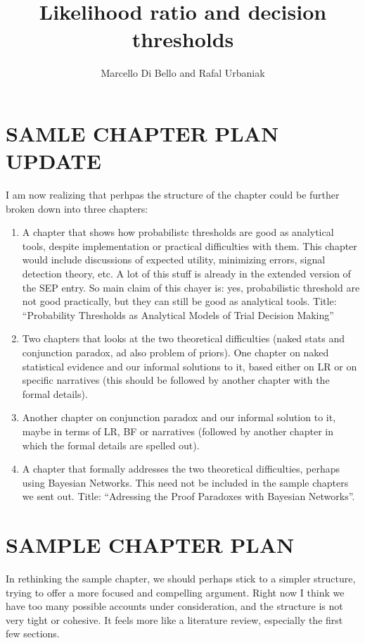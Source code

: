 \documentclass[10pt,dvipsnames,enabledeprecatedfontcommands]{scrartcl}
\title{Likelihood ratio and decision thresholds}
\author{Marcello Di Bello and Rafal Urbaniak}
\date{}
\begin{document}
\maketitle

\section*{SAMLE CHAPTER PLAN UPDATE}

I am now realizing that perhpas the structure of the chapter could be
further broken down into three chapters:

\begin{enumerate}
\def\labelenumi{\arabic{enumi}.}
\item
  A chapter that shows how probabilistc thresholds are good as
  analytical tools, despite implementation or practical difficulties
  with them. This chapter would include discussions of expected utility,
  minimizing errors, signal detection theory, etc. A lot of this stuff
  is already in the extended version of the SEP entry. So main claim of
  this chayer is: yes, probabilistic threshold are not good practically,
  but they can still be good as analytical tools. Title: ``Probability
  Thresholds as Analytical Models of Trial Decision Making''
\item
  Two chapters that looks at the two theoretical difficulties (naked
  stats and conjunction paradox, ad also problem of priors). One chapter
  on naked statistical evidence and our informal solutions to it, based
  either on LR or on specific narratives (this should be followed by
  another chapter with the formal details).
\item
  Another chapter on conjunction paradox and our informal solution to
  it, maybe in terms of LR, BF or narratives (followed by another
  chapter in which the formal details are spelled out).
\item
  A chapter that formally addresses the two theoretical difficulties,
  perhaps using Bayesian Networks. This need not be included in the
  sample chapters we sent out. Title: ``Adressing the Proof Paradoxes
  with Bayesian Networks''.
\end{enumerate}

\section*{SAMPLE CHAPTER PLAN}

In rethinking the sample chapter, we should perhaps stick to a simpler
structure, trying to offer a more focused and compelling argument. Right
now I think we have too many possible accounts under consideration, and
the structure is not very tight or cohesive. It feels more like a
literature review, especially the first few sections.
\end{document}
